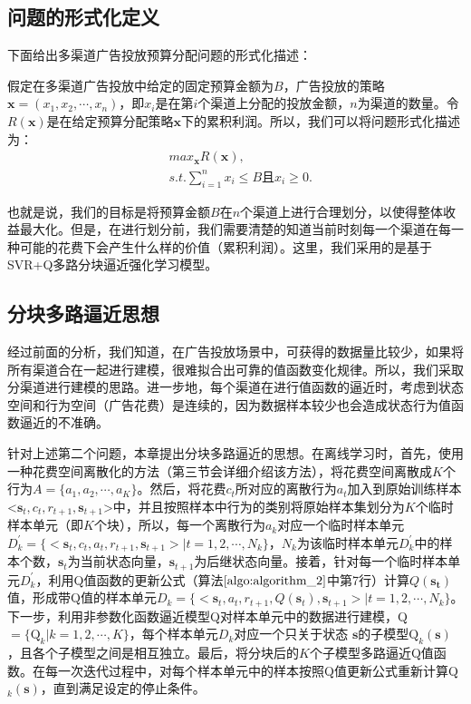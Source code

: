 \subsection{问题的形式化定义}
下面给出多渠道广告投放预算分配问题的形式化描述：

假定在多渠道广告投放中给定的固定预算金额为$B$，广告投放的策略$\bm{x}=(x_{1},x_{2},\cdots,x_{n})$，即$x_{i}$是在第$i$个渠道上分配的投放金额，$n$为渠道的数量。令$R(\bm{x})$是在给定预算分配策略$\bm{x}$下的累积利润。所以，我们可以将问题形式化描述为：
\begin{equation}\label{seq_ad_goal}
\begin{split}
&max_{\bm{x}} R(\bm{x}),\\
&s.t. \sum_{i=1}^{n} x_{i} \leqslant B \text{且} x_{i} \geq 0.
\end{split}
\end{equation}

也就是说，我们的目标是将预算金额$B$在$n$个渠道上进行合理划分，以使得整体收益最大化。但是，在进行划分前，我们需要清楚的知道当前时刻每一个渠道在每一种可能的花费下会产生什么样的价值（累积利润）。这里，我们采用的是基于SVR+Q多路分块逼近强化学习模型。

\subsection{分块多路逼近思想}
经过前面的分析，我们知道，在广告投放场景中，可获得的数据量比较少，如果将所有渠道合在一起进行建模，很难拟合出可靠的值函数变化规律。所以，我们采取分渠道进行建模的思路。进一步地，每个渠道在进行值函数的逼近时，考虑到状态空间和行为空间（广告花费）是连续的，因为数据样本较少也会造成状态行为值函数逼近的不准确。

针对上述第二个问题，本章提出分块多路逼近的思想。在离线学习时，首先，使用一种花费空间离散化的方法（第三节会详细介绍该方法），将花费空间离散成$K$个行为$A=\{a_{1},a_{2},\cdots,a_{K}\}$。然后，将花费$c_{t}$所对应的离散行为$a_{t}$加入到原始训练样本<$\mathbf{s}_{t},c_{t},r_{t+1},\mathbf{s}_{t+1}$>中，并且按照样本中行为的类别将原始样本集划分为$K$个临时样本单元（即$K$个块），所以，每一个离散行为$a_{k}$对应一个临时样本单元$D_{k}^{'}=\{<\mathbf{s}_{t},c_{t},a_{t},r_{t+1},\mathbf{s}_{t+1}>|t=1,2,\cdots,N_{k}\}$，$N_{k}$为该临时样本单元$D_{k}^{'}$中的样本个数，$\mathbf{s}_{t}$为当前状态向量，$\mathbf{s}_{t+1}$为后继状态向量。接着，针对每一个临时样本单元$D_{k}^{'}$，利用Q值函数的更新公式（算法$\ref{algo:algorithm_2}$中第7行）计算$Q(\mathbf{s_{t}})$值，形成带Q值的样本单元$D_{k}=\{<\mathbf{s}_{t},a_{t},r_{t+1},Q(\mathbf{s}_{t}),\mathbf{s}_{t+1}>|t=1,2,\cdots,N_{k}\}$。下一步，利用非参数化函数逼近模型Q对样本单元中的数据进行建模，Q$=\{\text{Q}_{k}|k=1,2,\cdots,K\}$，每个样本单元$D_{k}$对应一个只关于状态 $\mathbf{s}$的子模型$\text{Q}_{k}(\mathbf{s})$，且各个子模型之间是相互独立。最后，将分块后的$K$个子模型多路逼近Q值函数。在每一次迭代过程中，对每个样本单元中的样本按照Q值更新公式重新计算Q$_{k}(\mathbf{s})$，直到满足设定的停止条件。

